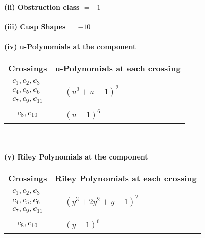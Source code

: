 \documentclass[1p]{elsarticle_modified}
\theoremstyle{definition}
\begin{document}
\flushleft \textbf{(ii) Obstruction class $= -1$}\\~\\
\flushleft \textbf{(iii) Cusp Shapes $= -10$}\\~\\
\newpage\renewcommand{\arraystretch}{1}
\flushleft \textbf{(iv) u-Polynomials at the component}\newline \\
\begin{tabular}{m{50pt}|m{274pt}}
Crossings & \hspace{64pt}u-Polynomials at each crossing \\
\hline $$\begin{aligned}c_{1},c_{2},c_{3}\\c_{4},c_{5},c_{6}\\c_{7},c_{9},c_{11}\end{aligned}$$&$\begin{aligned}
&(u^3+u-1)^2
\end{aligned}$\\
\hline $$\begin{aligned}c_{8},c_{10}\end{aligned}$$&$\begin{aligned}
&(u-1)^6
\end{aligned}$\\
\hline
\end{tabular}\\~\\
\newpage\renewcommand{\arraystretch}{1}
\flushleft \textbf{(v) Riley Polynomials at the component}\newline \\
\begin{tabular}{m{50pt}|m{274pt}}
Crossings & \hspace{64pt}Riley Polynomials at each crossing \\
\hline $$\begin{aligned}c_{1},c_{2},c_{3}\\c_{4},c_{5},c_{6}\\c_{7},c_{9},c_{11}\end{aligned}$$&$\begin{aligned}
&(y^3+2 y^2+y-1)^2
\end{aligned}$\\
\hline $$\begin{aligned}c_{8},c_{10}\end{aligned}$$&$\begin{aligned}
&(y-1)^6
\end{aligned}$\\
\hline
\end{tabular}\\~\\
\end{document}
